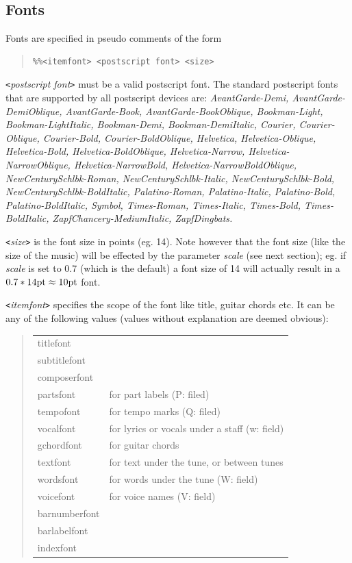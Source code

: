 \documentclass[a4paper]{article}
\begin{document}
\subsection{Fonts}
  
Fonts are specified in pseudo comments of the form
\begin{quote}
\begin{verbatim}
%%<itemfont> <postscript font> <size>
\end{verbatim}
\end{quote}
{\it \verb$<$postscript font\verb$>$ } must be a valid postscript
font. The standard postscript fonts that are supported by all postscript
devices are: {\it AvantGarde-Demi, AvantGarde-DemiOblique,
AvantGarde-Book, AvantGarde-BookOblique,
Bookman-Light, Bookman-LightItalic, Bookman-Demi, Bookman-DemiItalic,
Courier, Courier-Oblique, Courier-Bold, Courier-BoldOblique,
Helvetica, Helvetica-Oblique, Helvetica-Bold, Helvetica-BoldOblique,
Helvetica-Narrow, Helvetica-NarrowOblique, 
Helvetica-NarrowBold, Helvetica-NarrowBoldOblique,
NewCenturySchlbk-Roman, NewCenturySchlbk-Italic, NewCenturySchlbk-Bold,
NewCenturySchlbk-BoldItalic,
Palatino-Roman, Palatino-Italic, Palatino-Bold, Palatino-BoldItalic,
Symbol, Times-Roman, Times-Italic, Times-Bold, Times-BoldItalic, 
ZapfChancery-MediumItalic, ZapfDingbats.}
\par
{\it \verb$<$size\verb$>$ } is the font size in points 
(eg. 14). Note however that the font size (like the size of the music) 
will be effected by the parameter {\it scale} (see next section);
eg. if {\it scale } is set to 0.7 (which is the default) a font size
of 14 will actually result in a $0.7 * 14{\rm pt} \approx 10{\rm pt}$ font. 
\par
{\it \verb$<$itemfont\verb$>$ } specifies the scope of the font like title, guitar 
chords etc. It can be any of the following values (values without
explanation are deemed obvious):
\begin{quote}
\begin{tabular}{ll}
titlefont  & \\
subtitlefont    & \\
composerfont   & \\
partsfont   &   for part labels (P: filed) \\
tempofont   &   for tempo marks (Q: filed) \\
vocalfont   &   for lyrics or vocals under a staff (w: field) \\
gchordfont  &   for guitar chords \\
textfont    &   for text under the tune, or between tunes \\
wordsfont   &   for words under the tune (W: field) \\
voicefont   &   for voice names (V: field) \\
barnumberfont & \\
barlabelfont  & \\
indexfont   &   
\end{tabular}
\end{quote}
\end{document}
